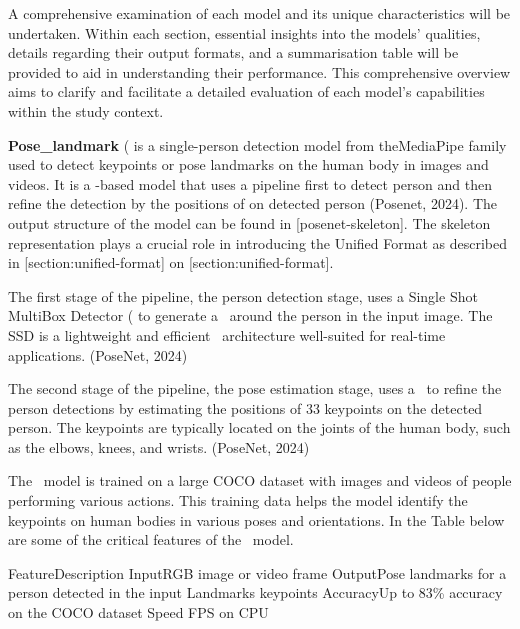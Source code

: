 A comprehensive examination of each model and its unique characteristics will be undertaken. Within each section, essential insights into the models' qualities, details regarding their output formats, and a summarisation table will be provided to aid in understanding their performance. This comprehensive overview aims to clarify and facilitate a detailed evaluation of each model's capabilities within the study context.

\break
{\bf Pose_landmark} (\PoseNet\) is a single-person detection model from the\break MediaPipe family used to detect keypoints or pose landmarks on the human body in images and videos. It is a \CNN\--based model that uses a  pipeline first to detect person \pojem{\BBOX} and then refine the detection by  the positions of   on detected person (\scc Posenet, 2024). The output structure of the  model can be found in [posenet-skeleton]. The skeleton representation plays a crucial role in introducing the Unified Format as described in [section:unified-format] on [section:unified-format].

The first stage of the pipeline, the person detection stage, uses a Single Shot MultiBox Detector (\SSD\) to generate a \BBOX\ around the person in the input image. The SSD is a lightweight and efficient \CNN\ architecture well-suited for real-time applications. (\scc PoseNet, 2024)

The second stage of the pipeline, the pose estimation stage, uses a \CNN\ to refine the person detections by estimating the positions of 33 keypoints on the detected person. The keypoints are typically located on the joints of the human body, such as the elbows, knees, and wrists. (\scc PoseNet, 2024)

The \PoseNet\ model is trained on a large COCO dataset with images and videos of people performing various actions. This training data helps the model identify the keypoints on human bodies in various poses and orientations. In the Table below are some of the critical features of the \PoseNet\ model.

 \setupTABLE[r][1][style=bold]
 \setupTABLE[c][each][offset=3dd]
 \setupTABLE[frame=off]
 \setupTABLE[r][1][topframe=on,bottomframe=on]
 \setupTABLE[r][6][bottomframe=on]
 \setupTABLE[c][each][leftframe=on]
 \setupTABLE[c][1][leftframe=off]
 \bTR\bTD Feature\eTD\bTD Description\eTD\eTR
 \bTR\bTD Input\eTD\bTD RGB image or video frame\eTD\eTR
 \bTR\bTD Output\eTD\bTD Pose landmarks for a person detected in the input\eTD\eTR
 \bTR\bTD Landmarks\eTD{} keypoints\eTD\eTR
 \bTR\bTD Accuracy\eTD\bTD Up to 83\% accuracy on the COCO dataset\eTD\eTR
 \bTR\bTD Speed\eTD{} FPS on CPU\eTD\eTR

